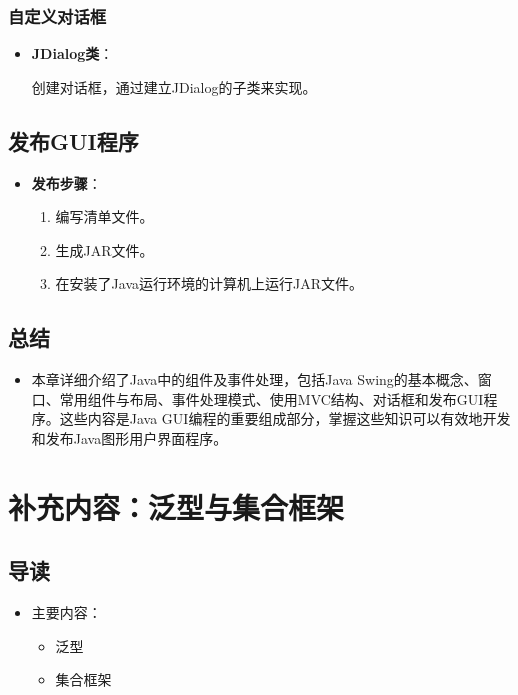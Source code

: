 \documentclass[a4paper, 10pt]{ctexart}
\begin{document}
\subsubsection{自定义对话框}
\begin{itemize}
  \item \textbf{JDialog类}：
  \begin{codeblock}
创建对话框，通过建立JDialog的子类来实现。
  \end{codeblock}
\end{itemize}

\subsection{发布GUI程序}
\begin{itemize}
  \item \textbf{发布步骤}：
  \begin{enumerate}
    \item 编写清单文件。
    \item 生成JAR文件。
    \item 在安装了Java运行环境的计算机上运行JAR文件。
  \end{enumerate}
\end{itemize}

\subsection{总结}
\begin{itemize}
  \item 本章详细介绍了Java中的组件及事件处理，包括Java Swing的基本概念、窗口、常用组件与布局、事件处理模式、使用MVC结构、对话框和发布GUI程序。这些内容是Java GUI编程的重要组成部分，掌握这些知识可以有效地开发和发布Java图形用户界面程序。
\end{itemize}

\section*{补充内容：泛型与集合框架}

\subsection{导读}
\begin{itemize}
  \item 主要内容：
  \begin{itemize}
    \item 泛型
    \item 集合框架
  \end{itemize}
\end{itemize}
\end{document}
